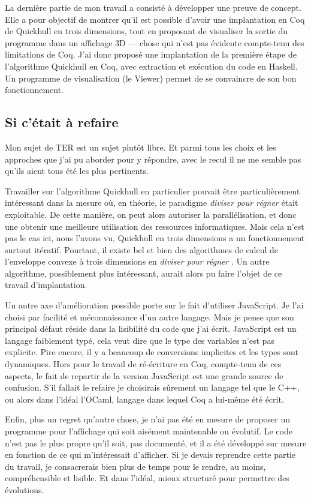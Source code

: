 \documentclass[]{article}
\begin{document}
La dernière partie de mon travail a consisté à développer une preuve de concept. Elle a pour objectif de montrer qu'il est possible d'avoir une implantation en Coq de Quickhull en trois dimensions, tout en proposant de visualiser la sortie du programme dans un affichage 3D — chose qui n'est pas évidente compte-tenu des limitations de Coq. J'ai donc proposé une implantation de la première étape de l'algorithme Quickhull en Coq, avec extraction et exécution du code en Haskell. Un programme de visualisation (le Viewer) permet de se convaincre de son bon fonctionnement.

\subsection{Si c'était à refaire}
Mon sujet de TER est un sujet plutôt libre. Et parmi tous les choix et les approches que j'ai pu aborder pour y répondre, avec le recul il ne me semble pas qu'ils aient tous été les plus pertinents.

Travailler sur l'algorithme Quickhull en particulier pouvait être particulièrement intéressant dans la mesure où, en théorie, le paradigme \emph{diviser pour régner} était exploitable. De cette manière, on peut alors autoriser la parallélisation, et donc une obtenir une meilleure utilisation des ressources informatiques. Mais cela n'est pas le cas ici, nous l'avons vu, Quickhull en trois dimensions a un fonctionnement surtout itératif. Pourtant, il existe bel et bien des algorithmes de calcul de l'enveloppe convexe à trois dimensions en \emph{diviser pour régner} \cite{https://doi.org/10.48550/arxiv.1205.1171}. Un autre algorithme, possiblement plus intéressant, aurait alors pu faire l'objet de ce travail d'implantation.

Un autre axe d'amélioration possible porte sur le fait d'utiliser JavaScript. Je l'ai choisi par facilité et méconnaissance d'un autre langage. Mais je pense que son principal défaut réside dans la lisibilité du code que j'ai écrit. JavaScript est un langage faiblement typé, cela veut dire que le type des variables n'est pas explicite. Pire encore, il y a beaucoup de conversions implicites et les types sont dynamiques. Hors pour le travail de ré-écriture en Coq, compte-tenu de ces aspects, le fait de repartir de la version JavaScript est une grande source de confusion. S'il fallait le refaire je choisirais sûrement un langage tel que le C++, ou alors dans l'idéal l'OCaml, langage dans lequel Coq a lui-même été écrit.

Enfin, plus un regret qu'autre chose, je n'ai pas été en mesure de proposer un programme pour l'affichage qui soit aisément maintenable ou évolutif. Le code n'est pas le plus propre qu'il soit, pas documenté, et il a été développé sur mesure en fonction de ce qui m'intéressait d'afficher. Si je devais reprendre cette partie du travail, je consacrerais bien plus de temps pour le rendre, au moins, compréhensible et lisible. Et dans l'idéal, mieux structuré pour permettre des évolutions.
\end{document}
